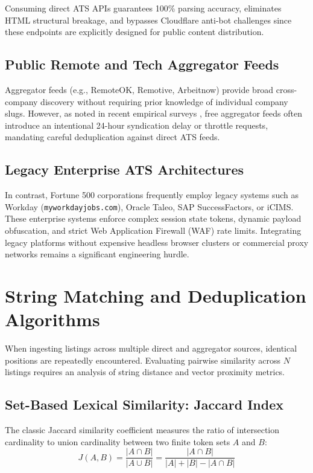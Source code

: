 Consuming direct ATS APIs guarantees 100\% parsing accuracy, eliminates HTML structural breakage, and bypasses Cloudflare anti-bot challenges since these endpoints are explicitly designed for public content distribution.

\subsection{Public Remote and Tech Aggregator Feeds}
Aggregator feeds (e.g., RemoteOK, Remotive, Arbeitnow) provide broad cross-company discovery without requiring prior knowledge of individual company slugs. However, as noted in recent empirical surveys \cite{broder1997syntactic}, free aggregator feeds often introduce an intentional 24-hour syndication delay or throttle requests, mandating careful deduplication against direct ATS feeds.

\subsection{Legacy Enterprise ATS Architectures}
In contrast, Fortune 500 corporations frequently employ legacy systems such as Workday (\texttt{myworkdayjobs.com}), Oracle Taleo, SAP SuccessFactors, or iCIMS. These enterprise systems enforce complex session state tokens, dynamic payload obfuscation, and strict Web Application Firewall (WAF) rate limits. Integrating legacy platforms without expensive headless browser clusters or commercial proxy networks remains a significant engineering hurdle.

\section{String Matching and Deduplication Algorithms}
When ingesting listings across multiple direct and aggregator sources, identical positions are repeatedly encountered. Evaluating pairwise similarity across $N$ listings requires an analysis of string distance and vector proximity metrics.

\subsection{Set-Based Lexical Similarity: Jaccard Index}
The classic Jaccard similarity coefficient \cite{jaccard1912distribution} measures the ratio of intersection cardinality to union cardinality between two finite token sets $A$ and $B$:
\begin{equation}
    J(A, B) = \frac{|A \cap B|}{|A \cup B|} = \frac{|A \cap B|}{|A| + |B| - |A \cap B|}
\end{equation}

